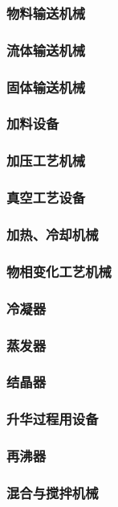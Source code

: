 \documentclass[UTF8]{../../ApplicationUniverse}
\begin{document}
    \subsubsection{物料输送机械}
        \subsubsection{流体输送机械}
        \subsubsection{固体输送机械}
        \subsubsection{加料设备}
    \subsubsection{加压工艺机械}
    \subsubsection{真空工艺设备}
    \subsubsection{加热、冷却机械}
    \subsubsection{物相变化工艺机械}
        \subsubsection{冷凝器}
        \subsubsection{蒸发器}
        \subsubsection{结晶器}
        \subsubsection{升华过程用设备}
        \subsubsection{再沸器}
    \subsubsection{混合与搅拌机械}
\end{document}
